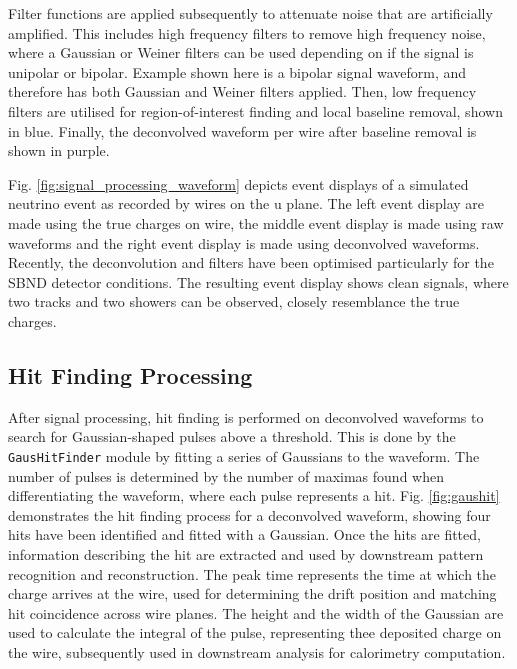 Filter functions are applied subsequently to attenuate noise that are artificially amplified.
This includes high frequency filters to remove high frequency noise, where a Gaussian or Weiner filters can be used depending on if the signal is unipolar or bipolar.
Example shown here is a bipolar signal waveform, and therefore has both Gaussian and Weiner filters applied.
Then, low frequency filters are utilised for region-of-interest finding and local baseline removal, shown in blue.
Finally, the deconvolved waveform per wire after baseline removal is shown in purple.

Fig. \ref{fig:signal_processing_waveform} depicts event displays of a simulated neutrino event as recorded by wires on the u plane.
The left event display are made using the true charges on wire, the middle event display is made using raw waveforms and the right event display is made using deconvolved waveforms.
Recently, the deconvolution and filters have been optimised particularly for the SBND detector conditions.
The resulting event display shows clean signals, where two tracks and two showers can be observed, closely resemblance the true charges. 

\subsection{Hit Finding Processing}
After signal processing, hit finding is performed on deconvolved waveforms to search for Gaussian-shaped pulses above a threshold.
This is done by the \texttt{GausHitFinder} module \cite{gaushitfinder} by fitting a series of Gaussians to the waveform.
The number of pulses is determined by the number of maximas found when differentiating the waveform, where each pulse represents a hit.
Fig. \ref{fig:gaushit} \cite{EdPhD} demonstrates the hit finding process for a deconvolved waveform, showing four hits have been identified and fitted with a Gaussian.
Once the hits are fitted, information describing the hit are extracted and used by downstream pattern recognition and reconstruction.
The peak time represents the time at which the charge arrives at the wire, used for determining the drift position and matching hit coincidence across wire planes.
The height and the width of the Gaussian are used to calculate the integral of the pulse, representing thee deposited charge on the wire, subsequently used in downstream analysis for calorimetry computation.

